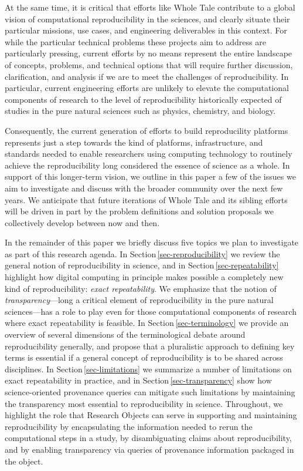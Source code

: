 At the same time, it is critical that efforts like Whole Tale contribute to a global
	vision of computational reproducibility in the sciences, and clearly situate
	their particular missions, use cases, and engineering deliverables in this context.
For while the particular technical problems these projects
	aim to address are particularly pressing, current efforts by no means
	represent the entire landscape of concepts, problems, and technical options
	that will require further discussion, clarification, and analysis if we are to meet
	the challenges of reproducibility.
In particular, current engineering efforts are unlikely to elevate the computational components
	of research to the level of reproducibility historically expected of studies in the
	pure natural sciences such as physics, chemistry, and biology.

Consequently, the current generation of efforts to build reproducility platforms represents
    just a step towards the kind of platforms, infrastructure, and standards
	needed to enable researchers using computing technology to routinely
	achieve the reproducibility long considered the essence of science as a whole.
In support of this longer-term vision, we outline in this paper
 a few of the issues we aim to investigate and discuss with the broader community over the next few years.
We anticipate that future iterations of Whole Tale and its sibling efforts
	will be driven in part by the problem definitions and solution proposals we collectively
	develop between now and then.

In the remainder of this paper we briefly discuss five topics we plan to investigate
	as part of this research agenda.
In Section\,\ref{sec-reproducibility} we review the general notion of
reproducibility in science, and in Section\,\ref{sec-repeatability}
	highlight how digital computing in principle makes possible a completely new kind of reproducibility:
	\emph{exact repeatability}.
We emphasize that the notion of \emph{transparency}---long a critical element of
	reproducibility in the pure natural sciences---has a role to play even for those computational components
	of research where exact repeatability is feasible.
In Section\,\ref{sec-terminology} we provide an overview of several dimensions of the terminological debate around reproducibility
	generally, and propose that a pluralistic approach to defining key terms is essential if a general
	concept of reproducibility is to be shared across disciplines.
In Section\,\ref{sec-limitations} we summarize a number of limitations on exact repeatability in practice, and in Section\,\ref{sec-transparency}
	show how science-oriented provenance queries can mitigate such limitations by maintaining
 	the transparency most essential to reproducibility in science.
Throughout, we highlight the role that Research Objects \cite{bechhofer2013whya}
	can serve in supporting and maintaining reproducibility
	by encapsulating the information needed to rerun the computational steps in a study,
	by disambiguating claims about reproducibility,
	and by enabling transparency via queries of provenance information packaged in the object.



